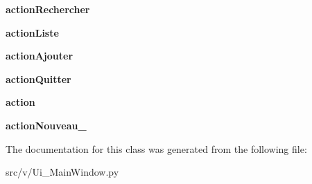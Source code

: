 \begin{DoxyCompactItemize}
\item 
\hypertarget{classsrc_1_1v_1_1_ui___main_window_1_1_ui___main_window_a7a5c9d44d5b08cd20950f49f3b4dfc3e}{}{\bfseries action\+Rechercher}\label{classsrc_1_1v_1_1_ui___main_window_1_1_ui___main_window_a7a5c9d44d5b08cd20950f49f3b4dfc3e}

\item 
\hypertarget{classsrc_1_1v_1_1_ui___main_window_1_1_ui___main_window_a17c9e4f957653b05467169b95a08cc51}{}{\bfseries action\+Liste}\label{classsrc_1_1v_1_1_ui___main_window_1_1_ui___main_window_a17c9e4f957653b05467169b95a08cc51}

\item 
\hypertarget{classsrc_1_1v_1_1_ui___main_window_1_1_ui___main_window_a1619f722e8afe98b13de15efa2687dc5}{}{\bfseries action\+Ajouter}\label{classsrc_1_1v_1_1_ui___main_window_1_1_ui___main_window_a1619f722e8afe98b13de15efa2687dc5}

\item 
\hypertarget{classsrc_1_1v_1_1_ui___main_window_1_1_ui___main_window_a54f7d94e17cdf74c1c09683cfe315ef2}{}{\bfseries action\+Quitter}\label{classsrc_1_1v_1_1_ui___main_window_1_1_ui___main_window_a54f7d94e17cdf74c1c09683cfe315ef2}

\item 
\hypertarget{classsrc_1_1v_1_1_ui___main_window_1_1_ui___main_window_a7250ad8c70ef5da27b4c3e22b268acc0}{}{\bfseries action}\label{classsrc_1_1v_1_1_ui___main_window_1_1_ui___main_window_a7250ad8c70ef5da27b4c3e22b268acc0}

\item 
\hypertarget{classsrc_1_1v_1_1_ui___main_window_1_1_ui___main_window_ac2d39bc08fb6fc46c6aedfe948c3a6ff}{}{\bfseries action\+Nouveau\+\_}\label{classsrc_1_1v_1_1_ui___main_window_1_1_ui___main_window_ac2d39bc08fb6fc46c6aedfe948c3a6ff}

\end{DoxyCompactItemize}


The documentation for this class was generated from the following file\+:\begin{DoxyCompactItemize}
\item 
src/v/Ui\+\_\+\+Main\+Window.\+py\end{DoxyCompactItemize}
